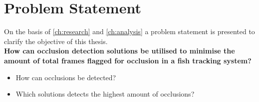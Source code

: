 \chapter{Problem Statement}
On the basis of \autoref{ch:research}  and \autoref{ch:analysis}  a problem statement is presented to clarify the objective of this thesis.\\

\textbf{How can occlusion detection solutions be utilised to minimise the amount of total frames flagged for occlusion in a fish tracking system?}

\begin{itemize}
	\item How can occlusions be detected?
	\item Which solutions detects the highest amount of occlusions?
\end{itemize}